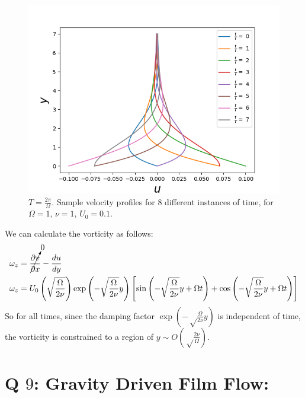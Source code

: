 \documentclass{article}
\begin{document}
\begin{figure}[H]
    \centering
    \includegraphics[scale = 0.8]{Figs/u_vs_y_diff_t.png}
    \caption{$T= \frac{2 \pi}{\Omega}$. Sample velocity profiles for $8$ different instances of time, for $\Omega = 1$, $\nu = 1$, $U_{0} = 0.1$.}
    \label{fig:oscillating_plate_soln}
\end{figure}

We can calculate the vorticity as follows:
\begin{align}
 \begin{split}
  \omega_{z} & = \cancelto{0}{\frac{\partial v}{\partial x}}-\frac{du}{dy} \\
  \omega_{z} &= U_{0}\left( \sqrt\frac{\Omega}{2\nu}  \right) \exp{\left(- \sqrt\frac{\Omega}{2\nu}  y \right)} \left[ \sin{\left(- \sqrt\frac{\Omega}{2\nu}  y  + \Omega t\right)} + \cos{\left(- \sqrt\frac{\Omega}{2\nu}  y  + \Omega t\right)}\right]
  \end{split}
\end{align}
So for all times, since the damping factor $\exp{\left(- \sqrt\frac{\Omega}{2\nu}  y \right)}$ is independent of time, the vorticity is constrained to a region of $y \sim O\left( \sqrt\frac{2\nu}{\Omega}\right)$.
\section{Q $9$: Gravity Driven Film Flow:}
\end{document}
